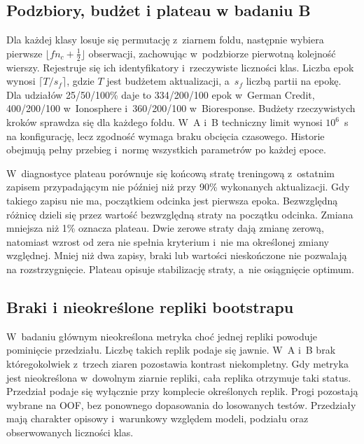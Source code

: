 \subsection*{Podzbiory, budżet i plateau w badaniu B}
\label{app:budzet-b}

Dla każdej klasy losuje się permutację z~ziarnem foldu, następnie wybiera pierwsze $\lfloor f n_c+\tfrac12\rfloor$ obserwacji, zachowując w~podzbiorze pierwotną kolejność wierszy. Rejestruje się ich identyfikatory i~rzeczywiste liczności klas. Liczba epok wynosi $\lceil T/s_f\rceil$, gdzie $T$ jest budżetem aktualizacji, a~$s_f$ liczbą partii na epokę. Dla udziałów 25/50/100\% daje to 334/200/100 epok w~German Credit, 400/200/100 w~Ionosphere i~360/200/100 w~Bioresponse. Budżety rzeczywistych kroków sprawdza się dla każdego foldu. W~A i~B techniczny limit wynosi $10^6$~s na konfigurację, lecz zgodność wymaga braku obcięcia czasowego. Historie obejmują pełny przebieg i~normę wszystkich parametrów po każdej epoce.

W~diagnostyce plateau porównuje się końcową stratę treningową z~ostatnim zapisem przypadającym nie później niż przy 90\% wykonanych aktualizacji. Gdy takiego zapisu nie ma, początkiem odcinka jest pierwsza epoka. Bezwzględną różnicę dzieli się przez wartość bezwzględną straty na początku odcinka. Zmiana mniejsza niż 1\% oznacza plateau. Dwie zerowe straty dają zmianę zerową, natomiast wzrost od zera nie spełnia kryterium i~nie ma określonej zmiany względnej. Mniej niż dwa zapisy, braki lub wartości nieskończone nie pozwalają na rozstrzygnięcie. Plateau opisuje stabilizację straty, a~nie osiągnięcie optimum.

\subsection*{Braki i nieokreślone repliki bootstrapu}
\label{app:bootstrap}

W~badaniu głównym nieokreślona metryka choć jednej repliki powoduje pominięcie przedziału. Liczbę takich replik podaje się jawnie. W~A i~B brak któregokolwiek z~trzech ziaren pozostawia kontrast niekompletny. Gdy metryka jest nieokreślona w~dowolnym ziarnie repliki, cała replika otrzymuje taki status. Przedział podaje się wyłącznie przy komplecie określonych replik. Progi pozostają wybrane na OOF, bez ponownego dopasowania do losowanych testów. Przedziały mają charakter opisowy i~warunkowy względem modeli, podziału oraz obserwowanych liczności klas.
